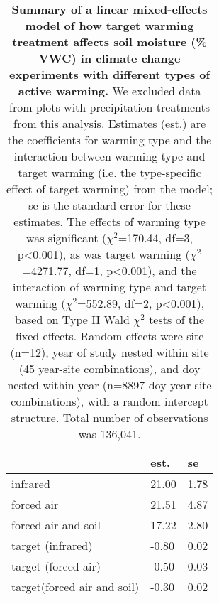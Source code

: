 \documentclass{article}
\begin{document}
\begin{table}[ht]
\centering
\caption{\textbf{Summary of a linear mixed-effects model of how target warming treatment affects soil moisture (\% VWC) in climate change experiments with different types of active warming.} We excluded data from plots with precipitation treatments from this analysis. Estimates (est.) are the coefficients for warming type and the interaction between warming type and target warming (i.e. the type-specific effect of target warming) from the model; se is the standard error for these estimates. The effects of warming type was significant ($\chi^{2}$=170.44, df=3, p<0.001), as was target warming ($\chi^{2}$=4271.77, df=1, p<0.001), and the interaction of warming type and target warming ($\chi^{2}$=552.89, df=2, p<0.001), based on Type II Wald $\chi^{2}$ tests of the fixed effects. Random effects were site (n=12), year of study nested within site (45 year-site combinations), and doy nested within year (n=8897 doy-year-site combinations), with a random intercept structure. Total number of observations was 136,041.} 
\label{table:targsoilmois}
\begingroup\footnotesize
\begin{tabular}{|p{}|p{}p{}|}
  \hline
 & est. & se \\ 
  \hline
infrared & 21.00 & 1.78 \\ 
  forced air & 21.51 & 4.87 \\ 
  forced air and soil & 17.22 & 2.80 \\ 
  target (infrared) & -0.80 & 0.02 \\ 
  target (forced air) & -0.50 & 0.03 \\ 
  target(forced air and soil) & -0.30 & 0.02 \\ 
   \hline
\end{tabular}
\endgroup
\end{table}%
\end{document}
